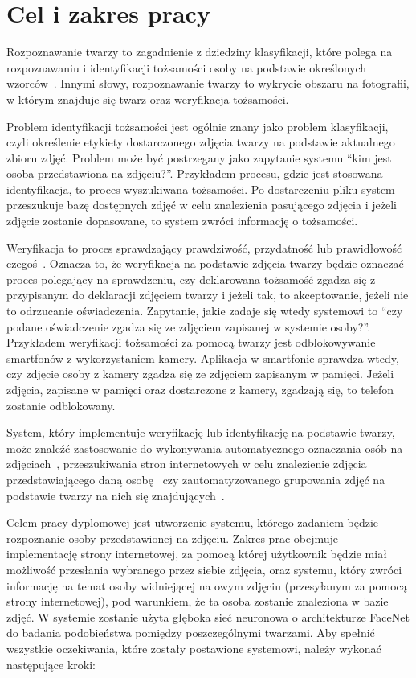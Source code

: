 \chapter{Cel i zakres pracy}

Rozpoznawanie twarzy to zagadnienie z dziedziny klasyfikacji,
które polega na rozpoznawaniu i identyfikacji
tożsamości osoby na podstawie określonych wzorców~\cite{william2019face}.
Innymi słowy, rozpoznawanie twarzy to wykrycie obszaru na fotografii,
w którym znajduje się twarz oraz weryfikacja tożsamości.

Problem identyfikacji tożsamości jest ogólnie znany jako problem klasyfikacji,
czyli określenie etykiety dostarczonego zdjęcia twarzy na podstawie aktualnego \linebreak zbioru zdjęć.
Problem może być postrzegany jako zapytanie systemu ``kim jest osoba przedstawiona na zdjęciu?''.
Przykładem procesu, gdzie jest stosowana identyfikacja, to proces wyszukiwana tożsamości.
Po dostarczeniu pliku system przeszukuje bazę dostępnych zdjęć w celu znalezienia pasującego zdjęcia
i jeżeli zdjęcie zostanie dopasowane, to system zwróci informację o tożsamości.

Weryfikacja to proces sprawdzający prawdziwość, przydatność lub prawidłowość czegoś~\cite{sjp_pwn_1996}.
Oznacza to, że weryfikacja na podstawie zdjęcia twarzy będzie oznaczać proces polegający na sprawdzeniu,
czy deklarowana tożsamość zgadza się z przypisanym do deklaracji zdjęciem twarzy i jeżeli tak,
to akceptowanie, jeżeli nie to odrzucanie oświadczenia.
Zapytanie, jakie zadaje się wtedy systemowi to
``czy podane oświadczenie zgadza się ze zdjęciem zapisanej w systemie osoby?''.
Przykładem weryfikacji tożsamości za pomocą twarzy jest odblokowywanie smartfonów z wykorzystaniem kamery.
Aplikacja w smartfonie sprawdza wtedy, czy zdjęcie osoby z kamery zgadza się ze zdjęciem zapisanym w pamięci.
Jeżeli zdjęcia, zapisane w pamięci oraz dostarczone z kamery, zgadzają się, to telefon zostanie odblokowany.

\pagebreak

System, który implementuje weryfikację lub identyfikację na podstawie twarzy,
może znaleźć zastosowanie do wykonywania automatycznego oznaczania osób na zdjęciach~\cite{facebook-aut-tag},
przeszukiwania stron internetowych w celu znalezienie zdjęcia przedstawiającego daną osobę~\cite{pimeyes}
czy zautomatyzowanego grupowania zdjęć na podstawie twarzy na nich się znajdujących~\cite{google-photos_groupby}.

Celem pracy dyplomowej jest utworzenie systemu, którego zadaniem będzie rozpoznanie osoby przedstawionej na zdjęciu.
Zakres prac obejmuje implementację strony internetowej,
za pomocą której użytkownik będzie miał możliwość przesłania wybranego przez siebie zdjęcia,
oraz systemu, który zwróci informację na temat osoby widniejącej na owym zdjęciu
(przesyłanym za pomocą strony internetowej),
pod warunkiem, że ta osoba zostanie znaleziona w bazie zdjęć.
W systemie zostanie użyta głęboka sieć neuronowa o architekturze FaceNet do badania
podobieństwa pomiędzy poszczególnymi twarzami.
Aby spełnić wszystkie oczekiwania, które zostały postawione systemowi, należy wykonać następujące kroki:

